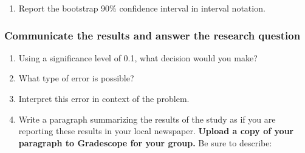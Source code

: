 \documentclass[
]{report}
\providecommand{\tightlist}{%
  \setlength{\itemsep}{0pt}\setlength{\parskip}{0pt}}
\begin{document}
\begin{enumerate}
\def\labelenumi{\arabic{enumi}.}
\setcounter{enumi}{10}
\tightlist
\item
  Report the bootstrap 90\% confidence interval in interval notation.\\
  \vspace{0.5in}
\end{enumerate}

\subsubsection*{Communicate the results and answer the research question}\label{communicate-the-results-and-answer-the-research-question-6}

\begin{enumerate}
\def\labelenumi{\arabic{enumi}.}
\setcounter{enumi}{11}
\item
  Using a significance level of 0.1, what decision would you make?
  \vspace{0.2in}
\item
  What type of error is possible?
  \vspace{0.3in}
\item
  Interpret this error in context of the problem.
  \vspace{0.8in}
\item
  Write a paragraph summarizing the results of the study as if you are reporting these results in your local newspaper. \textbf{Upload a copy of your paragraph to Gradescope for your group.} Be sure to describe:
\end{enumerate}
\end{document}
